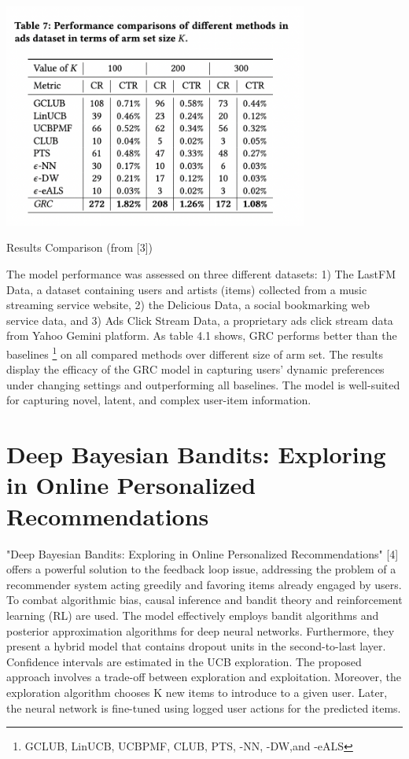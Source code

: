 \begin{table}[hh!]
    \centering
    \includegraphics[width=100mm]{results_GRC.png}
    \caption{Results Comparison (from [3])
    \label{overflow}}
\end{table}
The model performance was assessed on three different datasets: 1) The LastFM Data, a dataset containing  users and artists (items) collected from a music streaming service website, 2) the Delicious Data, a social bookmarking web service data, and 3) Ads Click Stream Data, a proprietary ads click stream data from Yahoo Gemini platform. As table 4.1 shows, GRC performs better than the baselines \footnote {GCLUB, LinUCB, UCBPMF, CLUB, PTS, \textepsilon-NN, \textepsilon-DW,and \textepsilon-eALS} on all compared methods over different size of arm set. The results display the efficacy of the GRC model in capturing users’ dynamic preferences under changing settings and outperforming all baselines. The model is well-suited for capturing novel, latent, and complex user-item information.

\section{Deep Bayesian Bandits: Exploring in Online Personalized
Recommendations}
"Deep Bayesian Bandits: Exploring in  Online Personalized Recommendations" [4] offers a powerful solution to the feedback loop issue, addressing the problem of a recommender system acting greedily and favoring items already engaged by users. To combat algorithmic bias, causal inference and bandit theory and reinforcement learning (RL) are used. The model effectively employs bandit algorithms and posterior approximation algorithms for deep neural networks. Furthermore, they present a hybrid model that contains dropout units in the second-to-last layer. Confidence intervals are estimated in the UCB exploration. The proposed approach involves a trade-off between exploration and exploitation. Moreover, the exploration algorithm chooses K new items to introduce to a given user. Later, the neural network is fine-tuned using logged user actions for the predicted items. 

